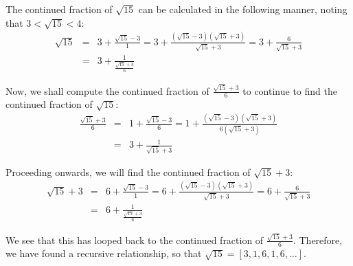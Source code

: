 \documentclass[psamsfonts]{amsart}
\newenvironment{sol}{{\bfseries Solution}}{\qedsymbol}
\theoremstyle{definition}
\theoremstyle{remark}
\numberwithin{equation}{section}
\begin{document}
\begin{sol}
The continued fraction of $\sqrt{15}$ can be calculated in the following manner, noting that $3 < \sqrt{15} < 4$:
\begin{eqnarray}
\sqrt{15} &=& 3 + \frac{\sqrt{15} -3}{1} = 3 + \frac{(\sqrt{15} - 3)(\sqrt{15} + 3)}{\sqrt{15} + 3} = 3 + \frac{6}{\sqrt{15} +3} \\
&=& 3 + \frac{1}{\frac{\sqrt{15}+3}{6}}
\end{eqnarray}

Now, we shall compute the continued fraction of $\frac{\sqrt{15} + 3}{6}$ to continue to find the continued fraction of $\sqrt{15}$:
\begin{eqnarray}
\frac{\sqrt{15} + 3}{6} &=& 1 + \frac{\sqrt{15} - 3}{6} = 1 + \frac{(\sqrt{15} - 3)(\sqrt{15}+3)}{6 (\sqrt{15} + 3)} \\
&=& 3 + \frac{1}{\sqrt{15} + 3}
\end{eqnarray}

Proceeding onwards, we will find the continued fraction of $\sqrt{15}+3$:
\begin{eqnarray}
\sqrt{15} + 3 &=& 6 + \frac{\sqrt{15} - 3}{1} = 6 + \frac{(\sqrt{15} -3)(\sqrt{15} + 3)}{\sqrt{15} +3} = 6 + \frac{6}{\sqrt{15}+3} \\
&=& 6 + \frac{1}{\frac{\sqrt{15}+3}{6}} 
\end{eqnarray}

We see that this has looped back to the continued fraction of $\frac{\sqrt{15}+3}{6}$. Therefore, we have found a recursive relationship, so that $\sqrt{15} = [3,1,6,1,6,\ldots]$. 
\end{sol}
\end{document}
